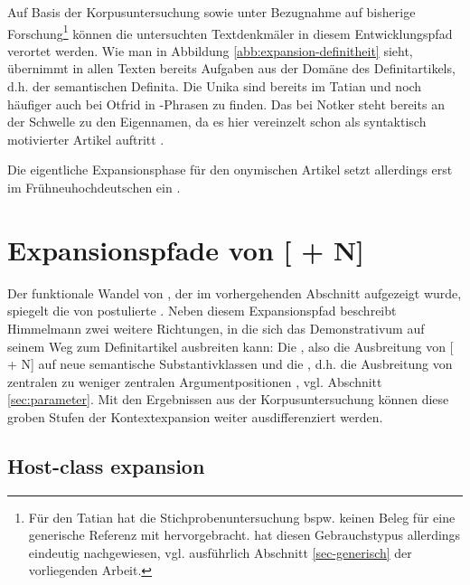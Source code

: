 Auf Basis der Korpusuntersuchung sowie unter Bezugnahme auf bisherige Forschung\footnote{Für den Tatian hat die Stichprobenuntersuchung bspw. keinen Beleg für eine generische Referenz mit  hervorgebracht. \textcite{Oubouzar1992} hat diesen Gebrauchstypus allerdings eindeutig nachgewiesen, vgl. ausführlich Abschnitt \ref{sec-generisch} der vorliegenden Arbeit.} können die untersuchten Textdenkmäler in diesem Entwicklungspfad verortet werden. Wie man in Abbildung \ref{abb:expansion-definitheit} sieht, übernimmt   in allen Texten bereits Aufgaben aus der Domäne des Definitartikels, d.h. der semantischen Definita. Die Unika sind bereits im Tatian und noch häufiger auch bei Otfrid in -Phrasen zu finden. Das  bei Notker steht bereits an der Schwelle zu den Eigennamen, da es hier vereinzelt schon als syntaktisch motivierter Artikel auftritt \parencite[ , s.][638]{Oubouzar1989}.

Die eigentliche Expansionsphase für den onymischen Artikel setzt allerdings erst im Frühneuhochdeutschen ein \parencite{Schmuck2020}. 


\section{Expansionspfade von [ + N]} \label{sec:disk-expansion}

Der funktionale Wandel von , der im vorhergehenden Abschnitt aufgezeigt wurde, spiegelt die von \textcite[32--33]{Himmelmann2004} postulierte . Neben diesem Expansionspfad beschreibt Himmelmann zwei weitere Richtungen, in die sich das Demonstrativum auf seinem Weg zum Definitartikel ausbreiten kann: Die , also die Ausbreitung von [ + N] auf neue semantische Substantivklassen und die , d.h. die Ausbreitung von zentralen zu weniger zentralen Argumentpositionen \parencite[32--33]{Himmelmann2004}, vgl. Abschnitt \ref{sec:parameter}. Mit den Ergebnissen aus der Korpusuntersuchung können diese groben Stufen der Kontextexpansion weiter ausdifferenziert werden.  

\subsection{Host-class expansion}

